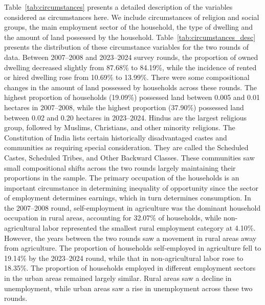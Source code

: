\documentclass[12pt]{article}
\theoremstyle{plain}
\theoremstyle{definition}
\begin{document}
Table~\ref{tab:circumstances} presents a detailed description of the variables considered as circumstances here. We include circumstances of religion and social groups, the main employment sector of the household, the type of dwelling and the amount of land possessed by the household. Table~\ref{tab:circumstances_desc} presents the distribution of these circumstance variables for the two rounds of data. Between 2007--2008 and 2023--2024 survey rounds, the proportion of owned dwelling decreased slightly from 87.68\% to 84.19\%, while the incidence of rented or hired dwelling rose from 10.69\% to 13.99\%. There were some compositional changes in the amount of land possessed by households across these rounds. The highest proportion of households (19.09\%) possessed land between 0.005 and 0.01 hectares in 2007--2008, while the highest proportion (37.90\%) possessed land between 0.02 and 0.20 hectares in 2023--2024. Hindus are the largest religious group, followed by Muslims, Christians, and other minority religions. The Constitution of India lists certain historically disadvantaged castes and communities as requiring special consideration. They are called the Scheduled Castes, Scheduled Tribes, and Other Backward Classes. These communities saw small compositional shifts across the two rounds largely maintaining their proportions in the sample.
The primary occupation of the households is an important circumstance in determining inequality of opportunity since the sector of employment determines earnings, which in turn determines consumption. In the 2007--2008 round, self-employment in agriculture was the dominant household occupation in rural areas, accounting for 32.07\% of households, while non-agricultural labor represented the smallest rural employment category at 4.10\%. However, the years between the two rounds saw a movement in rural areas away from agriculture. The proportion of households self-employed in agriculture fell to 19.14\% by the 2023--2024 round, while that in non-agricultural labor rose to 18.35\%. The proportion of households employed in different employment sectors in the urban areas remained largely similar. Rural areas saw a decline in unemployment, while urban areas saw a rise in unemployment across these two rounds.

\begin{table}[htbp]
    \centering\small
    \caption{Circumstance variables}
    
    \label{tab:circumstances}
\end{table}
\end{document}
